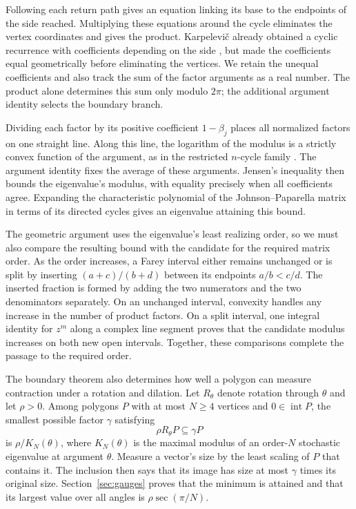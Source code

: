 \documentclass[11pt,a4paper]{article}
\theoremstyle{definition}
\theoremstyle{remark}
\numberwithin{equation}{section}
\begin{document}
Following each return path gives an equation linking its base to the endpoints of the side reached. Multiplying these equations around the cycle eliminates the vertex coordinates and gives the product. Karpelevi\v{c} already obtained a cyclic recurrence with coefficients depending on the side \cite[Theorem~VI and equation~(13)]{Karp}, but made the coefficients equal geometrically before eliminating the vertices. We retain the unequal coefficients and also track the sum of the factor arguments as a real number. The product alone determines this sum only modulo $2\pi$; the additional argument identity selects the boundary branch.

Dividing each factor by its positive coefficient $1-\beta_j$ places all normalized factors on one straight line. Along this line, the logarithm of the modulus is a strictly convex function of the argument, as in the restricted $n$-cycle family \cite[Lemma~2.2 and Proposition~3.1]{VGNCycle}. The argument identity fixes the average of these arguments. Jensen's inequality then bounds the eigenvalue's modulus, with equality precisely when all coefficients agree. Expanding the characteristic polynomial of the Johnson--Paparella matrix in terms of its directed cycles gives an eigenvalue attaining this bound.

The geometric argument uses the eigenvalue's least realizing order, so we must also compare the resulting bound with the candidate for the required matrix order. As the order increases, a Farey interval either remains unchanged or is split by inserting $(a+c)/(b+d)$ between its endpoints $a/b<c/d$. The inserted fraction is formed by adding the two numerators and the two denominators separately. On an unchanged interval, convexity handles any increase in the number of product factors. On a split interval, one integral identity for $z^m$ along a complex line segment proves that the candidate modulus increases on both new open intervals. Together, these comparisons complete the passage to the required order.

The boundary theorem also determines how well a polygon can measure contraction under a rotation and dilation. Let $R_\theta$ denote rotation through $\theta$ and let $\rho>0$. Among polygons $P$ with at most $N\ge4$ vertices and $0\in\operatorname{int}P$, the smallest possible factor $\gamma$ satisfying
\[
 \rho R_\theta P\subseteq\gamma P
\]
is $\rho/K_N(\theta)$, where $K_N(\theta)$ is the maximal modulus of an order-$N$ stochastic eigenvalue at argument $\theta$. Measure a vector's size by the least scaling of $P$ that contains it. The inclusion then says that its image has size at most $\gamma$ times its original size. Section~\ref{sec:gauges} proves that the minimum is attained and that its largest value over all angles is $\rho\sec(\pi/N)$.
\end{document}
